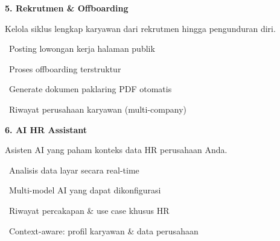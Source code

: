 \documentclass[a4paper]{article}
\begin{document}
\vspace{8pt}

\noindent
\begin{minipage}[t]{0.485\textwidth}
    \colorbox{OrangePrimary}{%
        \begin{minipage}{\dimexpr\textwidth-14pt}
            \vspace{5pt}
            {\fontsize{10}{13}\selectfont\bfseries\color{White} 5. Rekrutmen \& Offboarding}
            \vspace{5pt}
        \end{minipage}}
    \vspace{5pt}
    {\fontsize{9}{12}\selectfont\color{TextDark}%
    Kelola siklus lengkap karyawan dari rekrutmen hingga pengunduran diri.\par\vspace{3pt}
    \textbullet\ Posting lowongan kerja halaman publik\par\vspace{2pt}%
    \textbullet\ Proses offboarding terstruktur\par\vspace{2pt}%
    \textbullet\ Generate dokumen paklaring PDF otomatis\par\vspace{2pt}%
    \textbullet\ Riwayat perusahaan karyawan (multi-company)}%
\end{minipage}%
\hfill
\begin{minipage}[t]{0.485\textwidth}
    \colorbox{EmeraldDark}{%
        \begin{minipage}{\dimexpr\textwidth-14pt}
            \vspace{5pt}
            {\fontsize{10}{13}\selectfont\bfseries\color{White} 6. AI HR Assistant}
            \vspace{5pt}
        \end{minipage}}
    \vspace{5pt}
    {\fontsize{9}{12}\selectfont\color{TextDark}%
    Asisten AI yang paham konteks data HR perusahaan Anda.\par\vspace{3pt}
    \textbullet\ Analisis data layar secara real-time\par\vspace{2pt}%
    \textbullet\ Multi-model AI yang dapat dikonfigurasi\par\vspace{2pt}%
    \textbullet\ Riwayat percakapan \& use case khusus HR\par\vspace{2pt}%
    \textbullet\ Context-aware: profil karyawan \& data perusahaan}%
\end{minipage}
\end{document}
